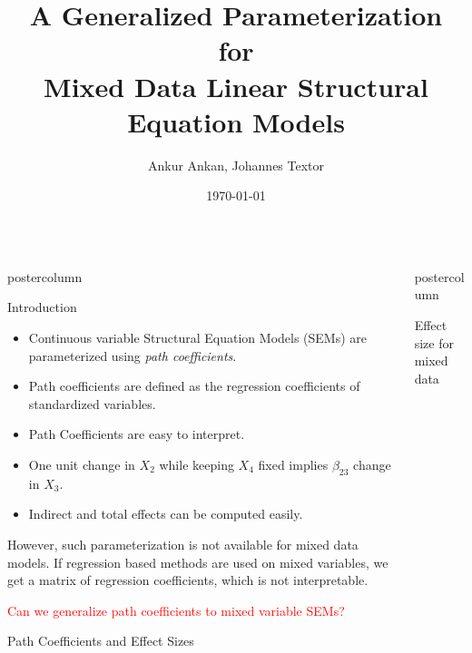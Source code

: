 \documentclass{beamer}
\title{\huge A Generalized Parameterization for \\ Mixed Data Linear Structural Equation Models}
\author{Ankur Ankan, Johannes Textor}
\institute[RU]{Institute for Computing and Information Sciences \\ Radboud University, Netherlands}
\date{\today}
\newlength{\columnheight}
\begin{document}
\begin{frame}
\begin{columns}
	\begin{column}{.33\textwidth}
		\begin{beamercolorbox}[center]{postercolumn}
			\begin{minipage}{.98\textwidth}  %
				\parbox[t][\columnheight]{\textwidth}{ %
	\begin{myblock}{Introduction}
	
		\begin{itemize}
			\item Continuous variable Structural Equation Models (SEMs) are parameterized using \emph{path coefficients}.
			\item Path coefficients are defined as the regression coefficients of standardized variables.
			\item Path Coefficients are easy to interpret.
			\item One unit change in $ X_2 $ while keeping $ X_4 $ fixed implies $ \beta_{23} $ change in $ X_3 $.
			\item Indirect and total effects can be computed easily.
		\end{itemize}

		\vspace{1em}

		However, such parameterization is not available for mixed data models. If regression based methods are used on mixed 
		variables, we get a matrix of regression coefficients, which is not interpretable.

		\vspace{1em}

		\textcolor{red}{Can we generalize path coefficients to mixed variable SEMs?}
	\end{myblock}\vfill
	\begin{myblock}{Path Coefficients and Effect Sizes}
	\end{myblock}\vfill
		}\end{minipage}\end{beamercolorbox}
	\end{column}


	\begin{column}{.33\textwidth}
		\begin{beamercolorbox}[center]{postercolumn}
			\begin{minipage}{.98\textwidth} %
				\parbox[t][\columnheight]{\textwidth}{ %
	\begin{myblock}{Effect size for mixed data}


\end{myblock}}
\end{minipage}
\end{beamercolorbox}
\end{column}
\end{columns}
\end{frame}
\end{document}

